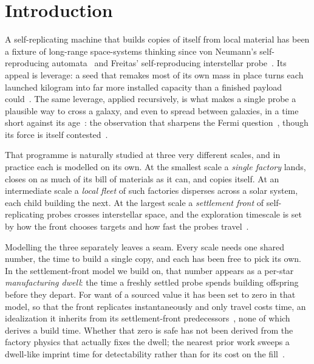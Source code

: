 \section{Introduction}

A self-replicating machine that builds copies of itself from local
material has been a fixture of long-range space-systems thinking since von Neumann's
self-reproducing automata~\citep{von-neumann-burks-1966} and Freitas' self-reproducing
interstellar probe~\citep{freitas-1980-interstellar-probe}. Its appeal is leverage: a
seed that remakes most of its own mass in place turns each launched kilogram into far
more installed capacity than a finished payload could~\citep{freitas-merkle-2004}. The
same leverage, applied recursively, is what makes a single probe a plausible way to
cross a galaxy, and even to spread between galaxies, in a time short against its
age~\citep{armstrong-sandberg-2013}: the observation that sharpens the Fermi
question~\citep{hart-1975,tipler-1980}, though its force is itself contested~\citep{sagan-newman-1983}.

That programme is naturally studied at three very different scales, and in practice each
is modelled on its own. At the smallest scale a \emph{single factory} lands, closes on
as much of its bill of materials as it can, and copies itself. At an intermediate scale a
\emph{local fleet} of such factories disperses across a solar system, each child building
the next. At the largest scale a \emph{settlement front} of self-replicating probes
crosses interstellar space, and the exploration timescale is set by how the front chooses
targets and how fast the probes travel~\citep{nicholson-forgan-2013,forgan-papadog-kitching-2013}.

Modelling the three separately leaves a seam. Every scale needs one shared number, the
time to build a single copy, and each has been free to pick its own. In the settlement-front
model we build on, that number appears as a per-star \emph{manufacturing dwell}: the time a
freshly settled probe spends building offspring before they depart. For want of a sourced
value it has been set to zero in that model, so that the front replicates instantaneously and
only travel costs time, an idealization it inherits from its settlement-front
predecessors~\citep{nicholson-forgan-2013,forgan-papadog-kitching-2013}, none of which derives
a build time. Whether that zero is safe has not been derived from the factory physics that
actually fixes the dwell; the nearest prior work sweeps a dwell-like imprint time for
detectability rather than for its cost on the fill~\citep{cotta-morales-2009}.

